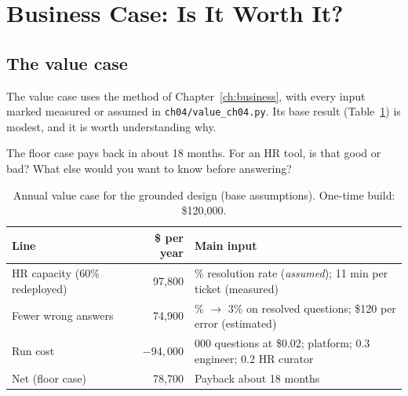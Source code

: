 
\section{Business Case: Is It Worth It?}
\label{sec:policy-business}

\subsection{The value case}

The value case uses the method of Chapter~\ref{ch:business}, with every input marked measured or assumed in \texttt{ch04/value\_ch04.py}. Its base result (Table~\ref{tab:policy-value}) is modest, and it is worth understanding why.

\begin{thinkabout}
The floor case pays back in about 18 months. For an HR tool, is that good or bad? What else would you want to know before answering?
\end{thinkabout}

\begin{table}[htbp]
\centering
\small
\caption{Annual value case for the grounded design (base assumptions). One-time build: \$120{,}000.}
\label{tab:policy-value}
\begin{tabularx}{\textwidth}{@{}>{\raggedright\arraybackslash}p{3.6cm}r>{\raggedright\arraybackslash}X@{}}
\toprule
\rowcolor{coHead} Line & \$ per year & Main input \\
\midrule
HR capacity (60\% redeployed) & 97{,}800 & 50\% resolution rate (\emph{assumed}); 11 min per ticket (measured) \\
Fewer wrong answers & 74{,}900 & 7\% $\to$ 3\% on resolved questions; \$120 per error (estimated) \\
Run cost & $-94{,}000$ & 48{,}000 questions at \$0.02; platform; 0.3 engineer; 0.2 HR curator \\
\midrule
\rowcolor{coGreenBg} Net (floor case) & 78{,}700 & Payback about 18 months \\
\bottomrule
\end{tabularx}
\end{table}

